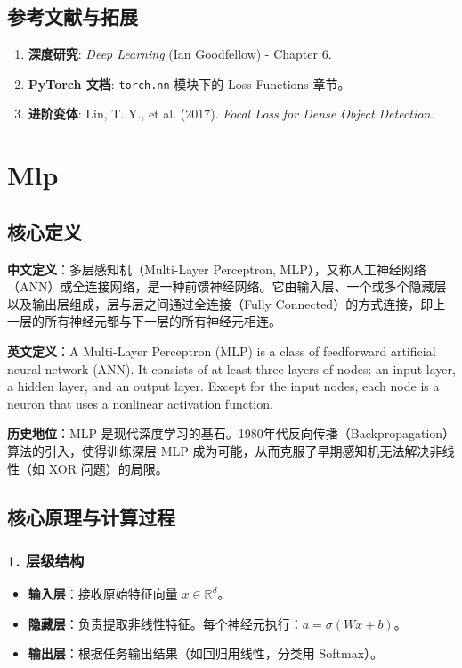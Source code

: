 \documentclass[12pt, a4paper]{book}
\begin{document}
\section{参考文献与拓展}
\begin{enumerate}
    \item \textbf{深度研究}: \textit{Deep Learning} (Ian Goodfellow) - Chapter 6.
    \item \textbf{PyTorch 文档}: \texttt{torch.nn} 模块下的 Loss Functions 章节。
    \item \textbf{进阶变体}: Lin, T. Y., et al. (2017). \textit{Focal Loss for Dense Object Detection}.
\end{enumerate}

\chapter{Mlp}


\section{核心定义}
\textbf{中文定义}：多层感知机（Multi-Layer Perceptron, MLP），又称人工神经网络（ANN）或全连接网络，是一种前馈神经网络。它由输入层、一个或多个隐藏层以及输出层组成，层与层之间通过全连接（Fully Connected）的方式连接，即上一层的所有神经元都与下一层的所有神经元相连。

\textbf{英文定义}：A Multi-Layer Perceptron (MLP) is a class of feedforward artificial neural network (ANN). It consists of at least three layers of nodes: an input layer, a hidden layer, and an output layer. Except for the input nodes, each node is a neuron that uses a nonlinear activation function.

\textbf{历史地位}：MLP 是现代深度学习的基石。1980年代反向传播（Backpropagation）算法的引入，使得训练深层 MLP 成为可能，从而克服了早期感知机无法解决非线性（如 XOR 问题）的局限。

\section{核心原理与计算过程}

\subsection{1. 层级结构}
\begin{itemize}
    \item \textbf{输入层}：接收原始特征向量 $x \in \mathbb{R}^d$。
    \item \textbf{隐藏层}：负责提取非线性特征。每个神经元执行：$a = \sigma(Wx + b)$。
    \item \textbf{输出层}：根据任务输出结果（如回归用线性，分类用 Softmax）。
\end{itemize}
\end{document}
